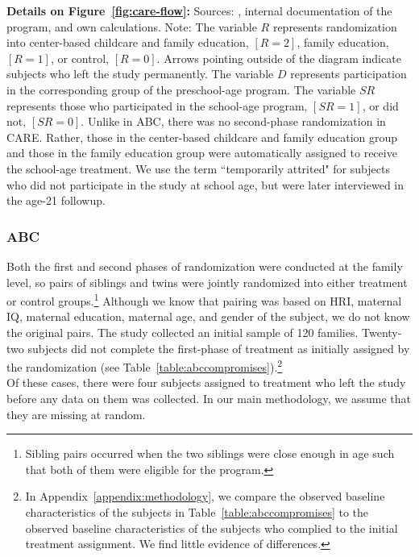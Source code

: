 \noindent \textbf{Details on Figure~\ref{fig:care-flow}:} Sources: \cite{Wasik_Ramey_etal_1990_CD}, internal documentation of the program, and own calculations. Note: The variable $R$ represents randomization into center-based childcare and family education, $[R=2]$, family education, $[R=1]$, or control, $[R=0]$. Arrows pointing outside of the diagram indicate subjects who left the study permanently. The variable $D$ represents participation in the corresponding group of the preschool-age program. The variable $SR$ represents those who participated in the school-age program, $[SR=1]$, or did not, $[SR=0]$. Unlike in ABC, there was no second-phase randomization in CARE. Rather, those in the center-based childcare and family education group and those in the family education group were automatically assigned to receive the school-age treatment. We use the term ``temporarily attrited" for subjects who did not participate in the study at school age, but were later interviewed in the age-21 followup.

\subsubsection{ABC}

\noindent Both the first and second phases of randomization were conducted at the family level, so pairs of siblings and twins were jointly randomized into either treatment or control groups.\footnote{Sibling pairs occurred when the two siblings were close enough in age such that both of them were eligible for the program.} Although we know that pairing was based on HRI, maternal IQ, maternal education, maternal age, and gender of the subject, we do not know the original pairs. The study collected an initial sample of 120 families. Twenty-two subjects did not complete the first-phase of treatment as initially assigned by the randomization (see Table~\ref{table:abccompromises}).\footnote{In Appendix~\ref{appendix:methodology}, we compare the observed baseline characteristics of the subjects in Table~\ref{table:abccompromises} to the observed baseline characteristics of the subjects who complied to the initial treatment assignment. We find little evidence of differences.}\\


\noindent Of these cases, there were four subjects assigned to treatment who left the study before any data on them was collected. In our main methodology, we assume that they are missing at random. \\

